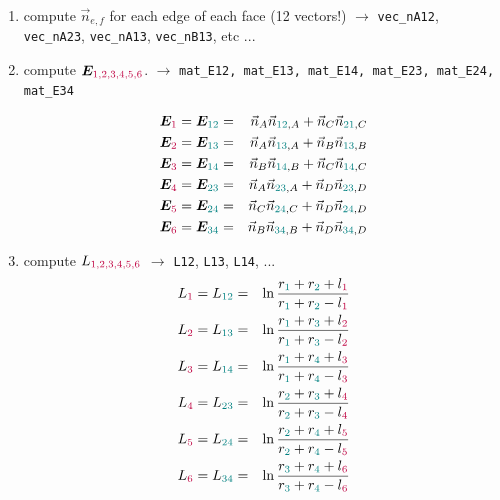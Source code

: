 \begin{enumerate}
\item compute $\vec{n}_{e,f}$ for each edge of each face (12 vectors!)
$\rightarrow$ \verb|vec_nA12|, \verb|vec_nA23|, \verb|vec_nA13|, \verb|vec_nB13|, etc ...


\item compute ${\bm E}_{\color{purple} 1,2,3,4,5,6}$. 
$\rightarrow$ \verb|mat_E12, mat_E13, mat_E14, mat_E23, mat_E24, mat_E34| 

\begin{eqnarray}
{\bm E}_{\color{purple}1} ={\bm E}_{\color{teal}12}
&=&\vec{n}_A \vec{n}_{{\color{teal}12},A} +\vec{n}_C \vec{n}_{{\color{teal}21},C}\\
{\bm E}_{\color{purple}2} ={\bm E}_{\color{teal}13}
&=& \vec{n}_A \vec{n}_{{\color{teal}13},A} +\vec{n}_B \vec{n}_{{\color{teal}13},B} \\
{\bm E}_{\color{purple}3} ={\bm E}_{\color{teal}14}
&=& \vec{n}_B \vec{n}_{{\color{teal}14},B}+\vec{n}_C \vec{n}_{{\color{teal}14},C} \\
{\bm E}_{\color{purple}4} ={\bm E}_{\color{teal}23}
&=& \vec{n}_A \vec{n}_{{\color{teal}23},A}+\vec{n}_D \vec{n}_{{\color{teal}23},D} \\
{\bm E}_{\color{purple}5} ={\bm E}_{\color{teal}24}
&=& \vec{n}_C \vec{n}_{{\color{teal}24},C} +\vec{n}_D \vec{n}_{{\color{teal}24},D} \\  
{\bm E}_{\color{purple}6} ={\bm E}_{\color{teal}34}
&=& \vec{n}_B \vec{n}_{{\color{teal}34},B} +\vec{n}_D \vec{n}_{{\color{teal}34},D} 
\end{eqnarray}



\item compute $L_{\color{purple}1,2,3,4,5,6}$ $\rightarrow$ \verb|L12|, \verb|L13|, \verb|L14|, ...
\begin{eqnarray}
L_{\color{purple}1} = L_{\color{teal}12} 
&=& \ln \frac{r_{\color{teal}1}+r_{\color{teal}2}+l_{\color{purple}1}}{r_{\color{teal}1}+r_{\color{teal}2}-l_{\color{purple}1}} \nonumber\\
L_{\color{purple}2} = L_{\color{teal}13} 
&=& \ln \frac{r_{\color{teal}1}+r_{\color{teal}3}+l_{\color{purple}2}}{r_{\color{teal}1}+r_{\color{teal}3}-l_{\color{purple}2}} \nonumber\\
L_{\color{purple}3} = L_{\color{teal}14} 
&=& \ln \frac{r_{\color{teal}1}+r_{\color{teal}4}+l_{\color{purple}3}}{r_{\color{teal}1}+r_{\color{teal}4}-l_{\color{purple}3}} \nonumber\\
L_{\color{purple}4} = L_{\color{teal}23} 
&=& \ln \frac{r_{\color{teal}2}+r_{\color{teal}3}+l_{\color{purple}4}}{r_{\color{teal}2}+r_{\color{teal}3}-l_{\color{purple}4}} \nonumber\\
L_{\color{purple}5} = L_{\color{teal}24} 
&=& \ln \frac{r_{\color{teal}2}+r_{\color{teal}4}+l_{\color{purple}5}}{r_{\color{teal}2}+r_{\color{teal}4}-l_{\color{purple}5}} \nonumber\\
L_{\color{purple}6} = L_{\color{teal}34} 
&=& \ln \frac{r_{\color{teal}3}+r_{\color{teal}4}+l_{\color{purple}6}}{r_{\color{teal}3}+r_{\color{teal}4}-l_{\color{purple}6}} \nonumber
\end{eqnarray}



\end{enumerate}
